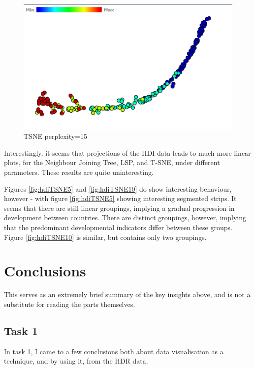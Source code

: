\documentclass[ 10pt ]{fphw}
\begin{document}
\begin{center}
\begin{figure}[H]
    \centering
	\includegraphics[width=0.65\columnwidth]{hdiProj/hdiTSNE-15.PNG}
	\caption{TSNE perplexity=15}
	\label{fig:hdiTSNE15}
	\end{figure}
\end{center}

Interestingly, it seems that projections of the HDI data leads to much more linear plots, for the Neighbour Joining Tree, LSP, and T-SNE, under different parameters. These results are quite uninteresting.

Figures  \ref{fig:hdiTSNE5} and \ref{fig:hdiTSNE10} do show interesting behaviour, however - with figure \ref{fig:hdiTSNE5} showing interesting segmented strips. It seems that there are still linear groupings, implying a gradual progression in development between countries. There are distinct groupings, however, implying that the predominant developmental indicators differ between these groups. Figure \ref{fig:hdiTSNE10} is similar, but contains only two groupings.


\section*{Conclusions}

This serves as an extremely brief summary of the key insights above, and is not a substitute for reading the parts themselves.

\subsection{Task 1}

In task 1, I came to a few conclusions both about data visualisation as a technique, and by using it, from the HDR data.
\end{document}
